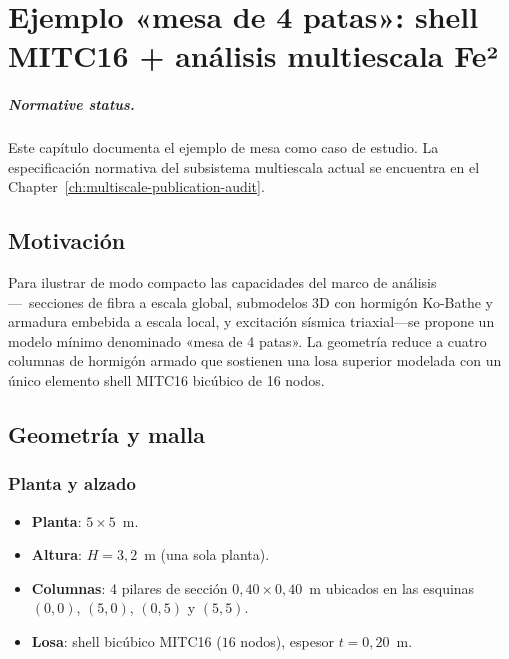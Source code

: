 \chapter{Ejemplo «mesa de 4 patas»: shell MITC16 + análisis multiescala F\MakeLowercase{E}²}
\label{ch:table-multiscale}

\paragraph{Normative status.}
Este capítulo documenta el ejemplo de mesa como caso de estudio.  La
especificación normativa del subsistema multiescala actual se encuentra en el
Chapter~\ref{ch:multiscale-publication-audit}.

\section{Motivación}

Para ilustrar de modo compacto las capacidades del marco de análisis
---~secciones de fibra a escala global, submodelos 3D con hormigón Ko-Bathe y
armadura embebida a escala local, y excitación sísmica triaxial---se propone un
modelo mínimo denominado «mesa de 4 patas».  La geometría reduce a cuatro
columnas de hormigón armado que sostienen una losa superior modelada con un
único elemento shell MITC16 bicúbico de 16 nodos.

\section{Geometría y malla}

\subsection{Planta y alzado}

\begin{itemize}
  \item \textbf{Planta}: $5 \times 5$~m.
  \item \textbf{Altura}: $H = 3{,}2$~m (una sola planta).
  \item \textbf{Columnas}: 4 pilares de sección $0{,}40 \times 0{,}40$~m
        ubicados en las esquinas $(0,0)$, $(5,0)$, $(0,5)$ y $(5,5)$.
  \item \textbf{Losa}: shell bicúbico MITC16 ($16$ nodos), espesor $t = 0{,}20$~m.
\end{itemize}

